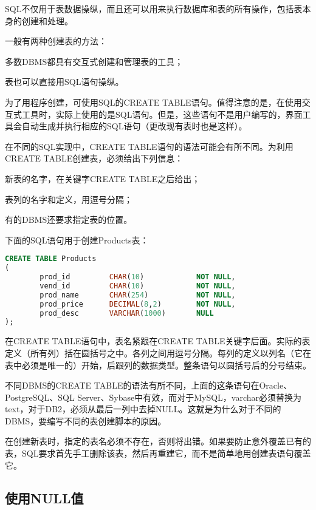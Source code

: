 SQL不仅用于表数据操纵，而且还可以用来执行数据库和表的所有操作，包括表本身的创建和处理。

一般有两种创建表的方法：

\begin{compactitem}
\item 多数DBMS都具有交互式创建和管理表的工具；
\item 表也可以直接用SQL语句操纵。
\end{compactitem}


为了用程序创建，可使用SQL的CREATE TABLE语句。值得注意的是，在使用交互式工具时，实际上使用的是SQL语句。但是，这些语句不是用户编写的，界面工具会自动生成并执行相应的SQL语句（更改现有表时也是这样）。

在不同的SQL实现中，CREATE TABLE语句的语法可能会有所不同。为利用CREATE TABLE创建表，必须给出下列信息：

\begin{compactitem}
\item 新表的名字，在关键字CREATE TABLE之后给出；
\item 表列的名字和定义，用逗号分隔；
\item 有的DBMS还要求指定表的位置。
\end{compactitem}

下面的SQL语句用于创建Products表：

\begin{lstlisting}[language=SQL]
CREATE TABLE Products
(
		prod_id			CHAR(10)			NOT NULL,
		vend_id			CHAR(10)			NOT NULL,
		prod_name		CHAR(254)			NOT NULL,
		prod_price		DECIMAL(8,2)		NOT NULL,
		prod_desc		VARCHAR(1000)		NULL
);
\end{lstlisting}

在CREATE TABLE语句中，表名紧跟在CREATE TABLE关键字后面。实际的表定义（所有列）括在圆括号之中。各列之间用逗号分隔。每列的定义以列名（它在表中必须是唯一的）开始，后跟列的数据类型。整条语句以圆括号后的分号结束。

不同DBMS的CREATE TABLE的语法有所不同，上面的这条语句在Oracle、PostgreSQL、SQL Server、Sybase中有效，而对于MySQL，varchar必须替换为text，对于DB2，必须从最后一列中去掉NULL。这就是为什么对于不同的DBMS，要编写不同的表创建脚本的原因。

在创建新表时，指定的表名必须不存在，否则将出错。如果要防止意外覆盖已有的表，SQL要求首先手工删除该表，然后再重建它，而不是简单地用创建表语句覆盖它。

\subsection{使用NULL值}

